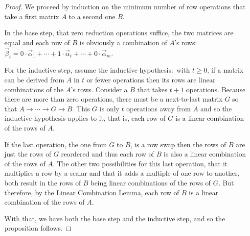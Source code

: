 \begin{proof}
We proceed by induction on the minimum number of row operations that take a
first matrix $A$ to a second one $B$.

In the base step, that
zero reduction operations suffice, the two matrices are equal and each 
row of $B$ is obviously a combination of
$A$'s rows: $\vec{\beta}_i
  =0\cdot\vec{\alpha}_1+\cdots+1\cdot\vec{\alpha}_i+\cdots+0\cdot\vec{\alpha}_m$.

For the inductive step, assume the inductive hypothesis:~with $t\geq 0$,
if a matrix can be derived from \( A \) in \( t \) or fewer operations 
then its rows are linear combinations of the $A$'s rows.
Consider a $B$ that takes $t+1$ operations.
Because there are more than zero operations, 
there must be a next-to-last matrix $G$  
so that $A\longrightarrow\cdots\longrightarrow G\longrightarrow B$.
This \( G \) is only $t$ operations away from \( A \) and so the inductive
hypothesis applies to it, that is, each row of \( G \)
is a linear combination of the rows of \( A \).

If the last operation, the one from \( G \) to \( B \), is a row swap then
the rows of $B$ are just the rows of $G$ reordered and thus each row of $B$
is also a linear combination of the rows of $A$.
The other two possibilities for this last operation, that it multiplies a 
row by a scalar and that it adds a multiple of one row to another, both result
in the rows of $B$ being linear combinations of the rows of $G$.
But therefore, by the Linear Combination Lemma, each row of $B$ is a linear
combination of the rows of $A$.


With that, we have both the base step and the inductive step, and 
so the proposition follows.
\end{proof}

